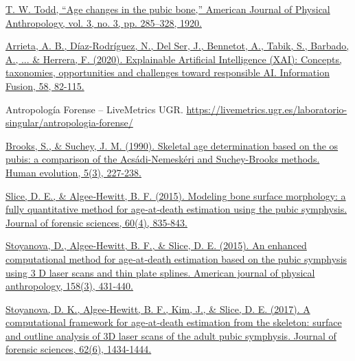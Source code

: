 
\begin{thebibliography}{9}



	\href{https://onlinelibrary.wiley.com/doi/abs/10.1002/ajpa.1330030301}{T. W. Todd, “Age changes in the pubic bone,” American Journal of Physical Anthropology, vol. 3, no. 3, pp. 285–328, 1920.}




	\href{https://www.sciencedirect.com/science/article/pii/S1566253519308103?via%3Dihub}{Arrieta, A. B., Díaz-Rodríguez, N., Del Ser, J., Bennetot, A., Tabik, S., Barbado, A., ... \& Herrera, F. (2020). Explainable Artificial Intelligence (XAI): Concepts, taxonomies, opportunities and challenges toward responsible AI. Information Fusion, 58, 82-115.}



	Antropología Forense – LiveMetrics UGR. \url{https://livemetrics.ugr.es/laboratorio-singular/antropologia-forense/}


	\href{https://link.springer.com/article/10.1007/BF02437238}{Brooks, S., \& Suchey, J. M. (1990). Skeletal age determination based on the os pubis: a comparison of the Acsádi-Nemeskéri and Suchey-Brooks methods. Human evolution, 5(3), 227-238.}


	\href{https://onlinelibrary.wiley.com/doi/full/10.1111/1556-4029.12778}{Slice, D. E., \& Algee‐Hewitt, B. F. (2015). Modeling bone surface morphology: a fully quantitative method for age‐at‐death estimation using the pubic symphysis. Journal of forensic sciences, 60(4), 835-843.}


	\href{https://onlinelibrary.wiley.com/doi/full/10.1002/ajpa.22797}{Stoyanova, D., Algee‐Hewitt, B. F., \& Slice, D. E. (2015). An enhanced computational method for age‐at‐death estimation based on the pubic symphysis using 3 D laser scans and thin plate splines. American journal of physical anthropology, 158(3), 431-440.}



	\href{https://onlinelibrary.wiley.com/doi/full/10.1111/1556-4029.13439}{Stoyanova, D. K., Algee‐Hewitt, B. F., Kim, J., \& Slice, D. E. (2017). A computational framework for age‐at‐death estimation from the skeleton: surface and outline analysis of 3D laser scans of the adult pubic symphysis. Journal of forensic sciences, 62(6), 1434-1444.}



\end{thebibliography}

